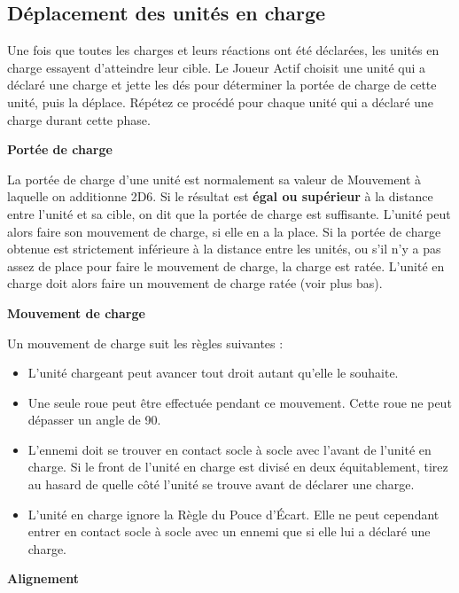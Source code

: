 \subsection{Déplacement des unités en charge}

Une fois que toutes les charges et leurs réactions ont été déclarées, les unités en charge essayent d'atteindre leur cible. Le Joueur Actif choisit une unité qui a déclaré une charge et jette les dés pour déterminer la portée de charge de cette unité, puis la déplace. Répétez ce procédé pour chaque unité qui a déclaré une charge durant cette phase.

\noindent\textbf{Portée de charge}

La portée de charge d'une unité est normalement sa valeur de Mouvement à laquelle on additionne 2D6. Si le résultat est \textbf{égal ou supérieur} à la distance entre l'unité et sa cible, on dit que la portée de charge est suffisante. L'unité peut alors faire son mouvement de charge, si elle en a la place. Si la portée de charge obtenue est strictement inférieure à la distance entre les unités, ou s'il n'y a pas assez de place pour faire le mouvement de charge, la charge est ratée. L'unité en charge doit alors faire un mouvement de charge ratée (voir plus bas).

\noindent\textbf{Mouvement de charge}

Un mouvement de charge suit les règles suivantes :
\begin{itemize}[label={-}]
\item L'unité chargeant peut avancer tout droit autant qu'elle le souhaite.
\item Une seule roue peut être effectuée pendant ce mouvement. Cette roue ne peut dépasser un angle de 90{\text{\degree}}.
\item L'ennemi doit se trouver en contact socle à socle avec l'avant de l'unité en charge. Si le front de l'unité en charge est divisé en deux équitablement, tirez au hasard de quelle côté l'unité se trouve avant de déclarer une charge.
\item L'unité en charge ignore la Règle du Pouce d'Écart. Elle ne peut cependant entrer en contact socle à socle avec un ennemi que si elle lui a déclaré une charge.
\end{itemize}

\noindent\textbf{Alignement}

